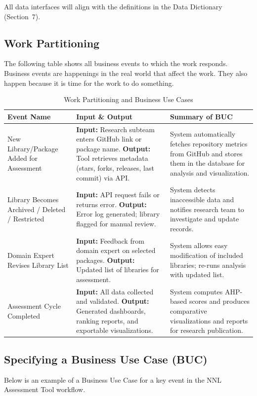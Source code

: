 \documentclass[12pt]{article}
\begin{document}
All data interfaces will align with the definitions in the Data Dictionary (Section~7).

\subsection{Work Partitioning}
The following table shows all business events to which the work responds. Business events are happenings in the real world that affect the work. They also happen because it is time for the work to do something.
\begin{table}[H]
\centering
\caption{Work Partitioning and Business Use Cases}
\begin{tabularx}{\textwidth}{|p{3.5cm}|X|X|}
\hline
\textbf{Event Name} & \textbf{Input \& Output} & \textbf{Summary of BUC} \\ \hline

New Library/Package Added for Assessment &
\textbf{Input:} Research subteam enters GitHub link or package name.
\textbf{Output:} Tool retrieves metadata (stars, forks, releases, last commit) via API. &
System automatically fetches repository metrics from GitHub and stores them in the database for analysis and visualization. \\ \hline

Library Becomes Archived / Deleted / Restricted &
\textbf{Input:} API request fails or returns error.
\textbf{Output:} Error log generated; library flagged for manual review. &
System detects inaccessible data and notifies research team to investigate and update records. \\ \hline

Domain Expert Revises Library List &
\textbf{Input:} Feedback from domain expert on selected packages.
\textbf{Output:} Updated list of libraries for assessment. &
System allows easy modification of included libraries; re-runs analysis with updated list. \\ \hline

Assessment Cycle Completed &
\textbf{Input:} All data collected and validated.
\textbf{Output:} Generated dashboards, ranking reports, and exportable visualizations. &
System computes AHP-based scores and produces comparative visualizations and reports for research publication. \\ \hline

\end{tabularx}
\end{table}

\subsection{Specifying a Business Use Case (BUC)}
Below is an example of a Business Use Case for a key event in the NNL Assessment Tool workflow.
\end{document}
